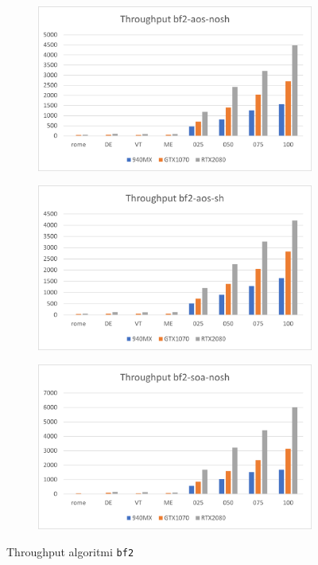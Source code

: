 \documentclass[12pt,a4paper,oneside]{book}
\begin{document}
	\begin{figure}[b]
		\centering
		\begin{subfigure}{.5\textwidth}
			\centering
			\includegraphics[width=\textwidth]{throughput_bf2-aos-nosh}
		\end{subfigure}%
		\begin{subfigure}{.5\textwidth}
			\centering
			\includegraphics[width=\textwidth]{throughput_bf2-aos-sh}
		\end{subfigure}
		\begin{subfigure}{.5\textwidth}
			\centering
			\includegraphics[width=\textwidth]{throughput_bf2-soa-nosh}
		\end{subfigure}%
		\caption{Throughput algoritmi \texttt{bf2}}
		\label{fig:throughput_bf2}
	\end{figure}
	
\end{document}
